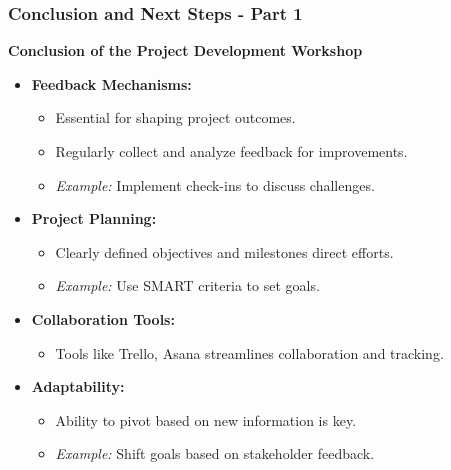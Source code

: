 \documentclass[aspectratio=169]{beamer}
\begin{document}
\begin{frame}[fragile]
  \frametitle{Conclusion and Next Steps - Part 1}
  \textbf{Conclusion of the Project Development Workshop}
  \begin{itemize}
    \item \textbf{Feedback Mechanisms:}
    \begin{itemize}
        \item Essential for shaping project outcomes. 
        \item Regularly collect and analyze feedback for improvements.
        \item \textit{Example:} Implement check-ins to discuss challenges.
    \end{itemize}
    
    \item \textbf{Project Planning:}
    \begin{itemize}
        \item Clearly defined objectives and milestones direct efforts. 
        \item \textit{Example:} Use SMART criteria to set goals.
    \end{itemize}

    \item \textbf{Collaboration Tools:}
    \begin{itemize}
        \item Tools like Trello, Asana streamlines collaboration and tracking.
    \end{itemize}
    
    \item \textbf{Adaptability:}
    \begin{itemize}
        \item Ability to pivot based on new information is key.
        \item \textit{Example:} Shift goals based on stakeholder feedback.
    \end{itemize}
  \end{itemize}
\end{frame}
\end{document}
